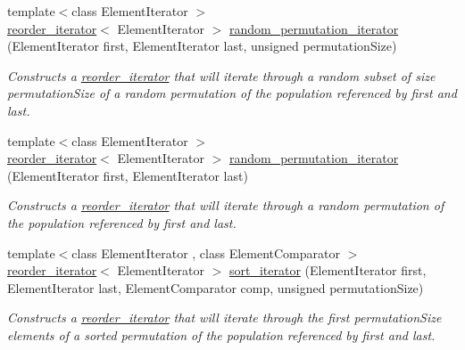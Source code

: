 \begin{DoxyCompactItemize}
\item 
{\footnotesize template$<$class ElementIterator $>$ }\\\hyperlink{classtrsl_1_1reorder__iterator}{reorder\_\-iterator}$<$ ElementIterator $>$ \hyperlink{namespacetrsl_afb566791dfade70af49beaa5b816e7ee}{random\_\-permutation\_\-iterator} (ElementIterator first, ElementIterator last, unsigned permutationSize)
\begin{DoxyCompactList}\small\item\em Constructs a \hyperlink{classtrsl_1_1reorder__iterator}{reorder\_\-iterator} that will iterate through a random subset of size {\ttfamily permutationSize} of a random permutation of the population referenced by {\ttfamily first} and {\ttfamily last}. \item\end{DoxyCompactList}\item 
{\footnotesize template$<$class ElementIterator $>$ }\\\hyperlink{classtrsl_1_1reorder__iterator}{reorder\_\-iterator}$<$ ElementIterator $>$ \hyperlink{namespacetrsl_a1d987a0f24b3d75783119747c4a22723}{random\_\-permutation\_\-iterator} (ElementIterator first, ElementIterator last)
\begin{DoxyCompactList}\small\item\em Constructs a \hyperlink{classtrsl_1_1reorder__iterator}{reorder\_\-iterator} that will iterate through a random permutation of the population referenced by {\ttfamily first} and {\ttfamily last}. \item\end{DoxyCompactList}\item 
{\footnotesize template$<$class ElementIterator , class ElementComparator $>$ }\\\hyperlink{classtrsl_1_1reorder__iterator}{reorder\_\-iterator}$<$ ElementIterator $>$ \hyperlink{namespacetrsl_aa23892a3c8929e627df1618c6b5dd2df}{sort\_\-iterator} (ElementIterator first, ElementIterator last, ElementComparator comp, unsigned permutationSize)
\begin{DoxyCompactList}\small\item\em Constructs a \hyperlink{classtrsl_1_1reorder__iterator}{reorder\_\-iterator} that will iterate through the first {\ttfamily permutationSize} elements of a sorted permutation of the population referenced by {\ttfamily first} and {\ttfamily last}. \item\end{DoxyCompactList}\item 

\end{DoxyCompactItemize}
